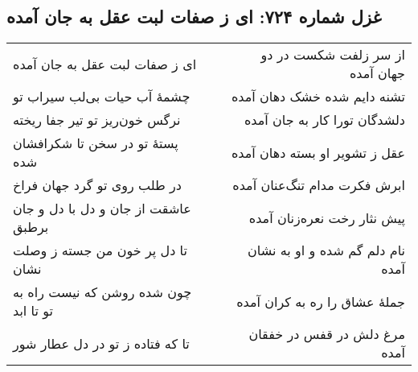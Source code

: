 \begin{center}
\section*{غزل شماره ۷۲۴: ای ز صفات لبت عقل به جان آمده}
\label{sec:724}
\begin{longtable}{l p{0.5cm} r}
ای ز صفات لبت عقل به جان آمده
&&
از سر زلفت شکست در دو جهان آمده
\\
چشمهٔ آب حیات بی‌لب سیراب تو
&&
تشنه دایم شده خشک دهان آمده
\\
نرگس خون‌ریز تو تیر جفا ریخته
&&
دلشدگان تورا کار به جان آمده
\\
پستهٔ تو در سخن تا شکرافشان شده
&&
عقل ز تشویر او بسته دهان آمده
\\
در طلب روی تو گرد جهان فراخ
&&
ابرش فکرت مدام تنگ‌عنان آمده
\\
عاشقت از جان و دل با دل و جان برطبق
&&
پیش نثار رخت نعره‌زنان آمده
\\
تا دل پر خون من جسته ز وصلت نشان
&&
نام دلم گم شده و او به نشان آمده
\\
چون شده روشن که نیست راه به تو تا ابد
&&
جملهٔ عشاق را ره به کران آمده
\\
تا که فتاده ز تو در دل عطار شور
&&
مرغ دلش در قفس در خفقان آمده
\\
\end{longtable}
\end{center}
